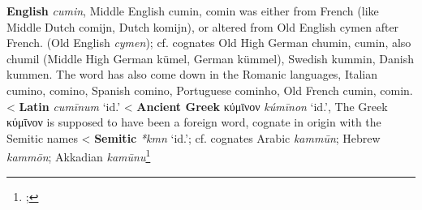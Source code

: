 \begin{etymology}\label{ety:cumin}
\textbf{English} \textit{cumin}, Middle English cumin, comin was either from French (like Middle Dutch comijn, Dutch komijn), or altered from Old English cymen after French. (Old English \textit{cymen}); cf. cognates Old High German chumin, cumin, also chumil (Middle High German kümel, German kümmel), Swedish kummin, Danish kummen. The word has also come down in the Romanic languages, Italian cumino, comino, Spanish comino, Portuguese cominho, Old French cumin, comin. 
< \textbf{Latin} \textit{cumīnum} `id.'
< \textbf{Ancient Greek} {κύμῑνον} \textit{kúmīnon} `id.', The Greek κύμῑνον is supposed to have been a foreign word, cognate in origin with the Semitic names
< \textbf{Semitic} \textit{*kmn} `id.'; cf. cognates Arabic \textit{kammūn}; Hebrew \textit{kammōn}; Akkadian \textit{kamūnu}\footnote{\textcite[s.v. cumin]{oed}; }
\end{etymology}